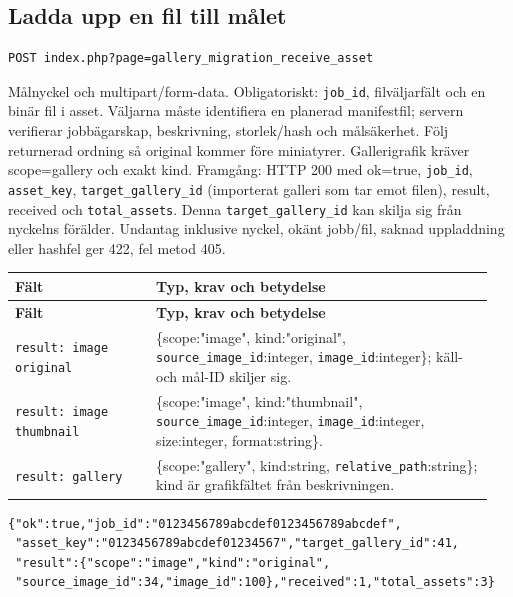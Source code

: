 \documentclass[11pt,a4paper]{article}
\newcommand{\codeword}[1]{\nolinkurl{#1}}
\begin{document}
\subsection{\texorpdfstring{Ladda upp en fil till målet}{Ladda upp en fil till målet}}

\label{api352:migration-receive-asset}

\begin{lstlisting}[language={}]
POST index.php?page=gallery_migration_receive_asset
\end{lstlisting}

Målnyckel och multipart/form-data. Obligatoriskt: \codeword{job_id}, filväljarfält och en
binär fil i asset. Väljarna måste identifiera en planerad manifestfil; servern verifierar
jobbägarskap, beskrivning, storlek/hash och målsäkerhet. Följ returnerad ordning så original
kommer före miniatyrer. Gallerigrafik kräver scope=gallery och exakt kind. Framgång: HTTP
200 med ok=true, \codeword{job_id}, \codeword{asset_key}, \codeword{target_gallery_id}
(importerat galleri som tar emot filen), result, received och \codeword{total_assets}. Denna
\codeword{target_gallery_id} kan skilja sig från nyckelns förälder. Undantag inklusive
nyckel, okänt jobb/fil, saknad uppladdning eller hashfel ger 422, fel metod 405.

\begin{longtable}{@{}>{\RaggedRight\arraybackslash}p{0.28\linewidth}>{\RaggedRight\arraybackslash}p{0.67\linewidth}@{}}
\toprule
\textbf{Fält} & \textbf{Typ, krav och betydelse} \\
\midrule
\endfirsthead
\toprule
\textbf{Fält} & \textbf{Typ, krav och betydelse} \\
\midrule
\endhead
\bottomrule
\endfoot
\codeword{result: image original} & \{scope:"image", kind:"original",
\codeword{source_image_id}:integer, \codeword{image_id}:integer\}; käll- och mål-ID skiljer
sig. \\
\codeword{result: image thumbnail} & \{scope:"image", kind:"thumbnail",
\codeword{source_image_id}:integer, \codeword{image_id}:integer, size:integer,
format:string\}. \\
\codeword{result: gallery} & \{scope:"gallery", kind:string,
\codeword{relative_path}:string\}; kind är grafikfältet från beskrivningen. \\
\end{longtable}

\begin{lstlisting}[language={}]
{"ok":true,"job_id":"0123456789abcdef0123456789abcdef",
 "asset_key":"0123456789abcdef01234567","target_gallery_id":41,
 "result":{"scope":"image","kind":"original",
 "source_image_id":34,"image_id":100},"received":1,"total_assets":3}
\end{lstlisting}
\end{document}
